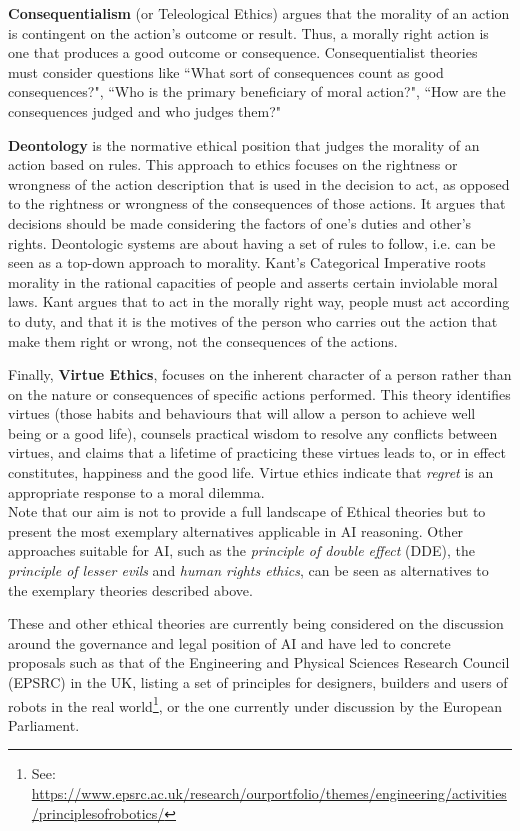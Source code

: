 \documentclass[twocolumn]{article}
\begin{document}
\textbf{Consequentialism} (or Teleological Ethics) argues that the morality of an action is contingent on the action's outcome or result. Thus, a morally right action is one that produces a good outcome or consequence. Consequentialist theories must consider questions like ``What sort of consequences count as good consequences?", ``Who is the primary beneficiary of moral action?", ``How are the consequences judged and who judges them?"

\textbf{Deontology}  is the normative ethical position that judges the morality of an action based on rules. This approach to ethics focuses on the rightness or wrongness of the action description that is used in the decision to act, as opposed to the rightness or wrongness of the consequences of those actions. It argues that decisions should be made considering the factors of one's duties and other's rights. Deontologic systems are about having a set of rules to follow, i.e. can be seen as a top-down approach to morality. Kant's Categorical Imperative roots morality in the rational capacities of people and asserts certain inviolable moral laws. Kant argues that to act in the morally right way, people must act according to duty, and that it is the motives of the person who carries out the action that make them right or wrong, not the consequences of the actions. 



Finally, \textbf{Virtue Ethics}, focuses on the inherent character of a person rather than on the nature or consequences of specific actions performed. This theory identifies virtues (those habits and behaviours that will allow a person to achieve well being or a good life), counsels practical wisdom to resolve any conflicts between virtues, and claims that a lifetime of practicing these virtues leads to, or in effect constitutes, happiness and the good life. Virtue ethics indicate that \textit{regret} is an appropriate response to a moral dilemma. \\

Note that our aim is not to provide a full landscape of Ethical theories but to present the most exemplary alternatives applicable in AI reasoning. Other approaches suitable for AI, such as the \textit{principle of double effect} (DDE), the  \textit{principle of lesser evils} and  \textit{human rights ethics}, can be seen as alternatives to the exemplary theories described above. 

These and other ethical theories are currently being considered on the discussion around the governance and legal position of AI 
and have led to concrete proposals such as that of the Engineering and Physical Sciences Research Council (EPSRC)  in the UK, listing a set of principles for designers, builders and users of robots in the real world\footnote{See: \url{https://www.epsrc.ac.uk/research/ourportfolio/themes/engineering/activities/principlesofrobotics/}}, or the one currently under discussion by the European Parliament. 
\end{document}
